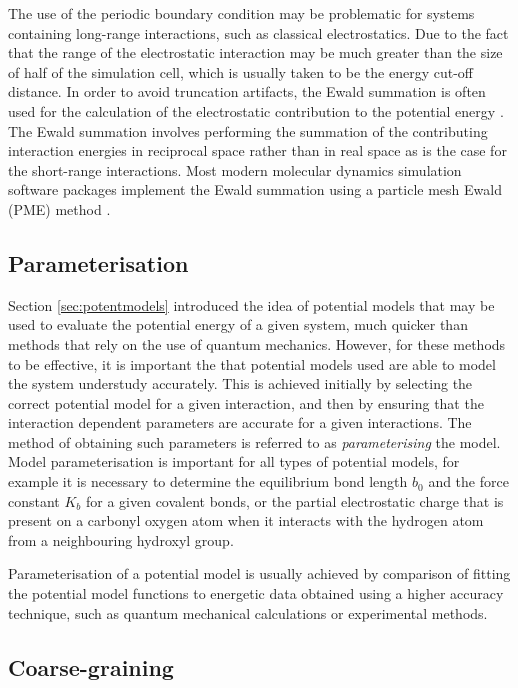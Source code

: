 The use of the periodic boundary condition may be problematic for systems containing long-range interactions, such as classical electrostatics.
Due to the fact that the range of the electrostatic interaction may be much greater than the size of half of the simulation cell, which is usually taken to be the energy cut-off distance.
In order to avoid truncation artifacts, the Ewald summation is often used for the calculation of the electrostatic contribution to the potential energy \cite{Ewald1921}.
The Ewald summation involves performing the summation of the contributing interaction energies in reciprocal space rather than in real space as is the case for the short-range interactions.
Most modern molecular dynamics simulation software packages implement the Ewald summation using a particle mesh Ewald (PME) method \cite{Essmann1995}.

\subsection{Parameterisation}
\label{sec:parameterisation}
Section \ref{sec:potentmodels} introduced the idea of potential models that may be used to evaluate the potential energy of a given system, much quicker than methods that rely on the use of quantum mechanics.
However, for these methods to be effective, it is important the that potential models used are able to model the system understudy accurately.
This is achieved initially by selecting the correct potential model for a given interaction, and then by ensuring that the interaction dependent parameters are accurate for a given interactions.
The method of obtaining such parameters is referred to as \emph{parameterising} the model.
Model parameterisation is important for all types of potential models, for example it is necessary to determine the equilibrium bond length $b_0$ and the force constant $K_b$ for a given covalent bonds, or the partial electrostatic charge that is present on a carbonyl oxygen atom when it interacts with the hydrogen atom from a neighbouring hydroxyl group. 

Parameterisation of a potential model is usually achieved by comparison of fitting the potential model functions to energetic data obtained using a higher accuracy technique, such as quantum mechanical calculations or experimental methods.



\subsection{Coarse-graining}
